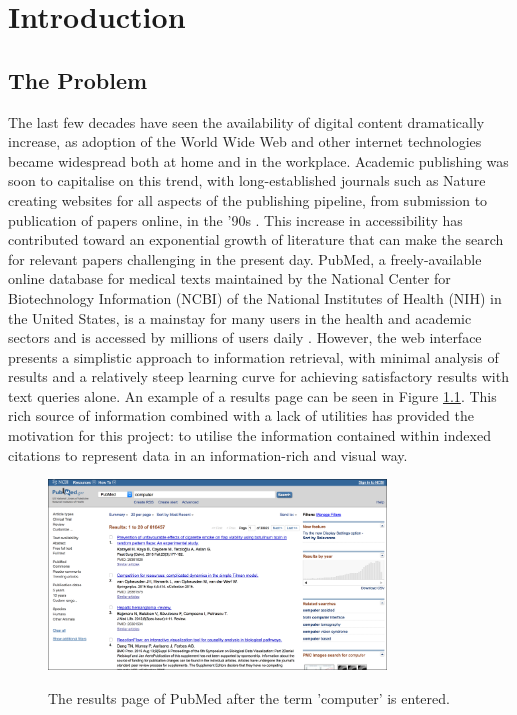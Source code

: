 \documentclass[Report.tex]{subfiles}
\begin{document}
\chapter{Introduction}
\section{The Problem}
The last few decades have seen the availability of digital content dramatically increase, as adoption of the World Wide Web and other internet technologies became widespread both at home and in the workplace. Academic publishing was soon to capitalise on this trend, with long-established journals such as Nature creating websites for all aspects of the publishing pipeline, from submission to publication of papers online, in the '90s \cite{nature-history}. This increase in accessibility has contributed toward an exponential growth of literature \cite{hunter-cohen} that can make the search for relevant papers challenging in the present day. PubMed, a freely-available online database for medical texts maintained by the National Center for Biotechnology Information (NCBI) of the National Institutes of Health (NIH) in the United States, is a mainstay for many users in the health and academic sectors and is accessed by millions of users daily \cite{dogan}.  However, the web interface presents a simplistic approach to information retrieval, with minimal analysis of results and a relatively steep learning curve for achieving satisfactory results with text queries alone. An example of a results page can be seen in Figure \ref{fig:pubmed}. This rich source of information combined with a lack of utilities has provided the motivation for this project: to utilise the information contained within indexed citations to represent data in an information-rich and visual way.\newline

\begin{figure}[!ht]
\begin{center}
	\includegraphics[width=0.8\textwidth]{../lib/images/pubmed.png}\\
	\caption{The results page of PubMed after the term 'computer' is entered.\label{fig:pubmed}}
\end{center}
\end{figure}
\end{document}
